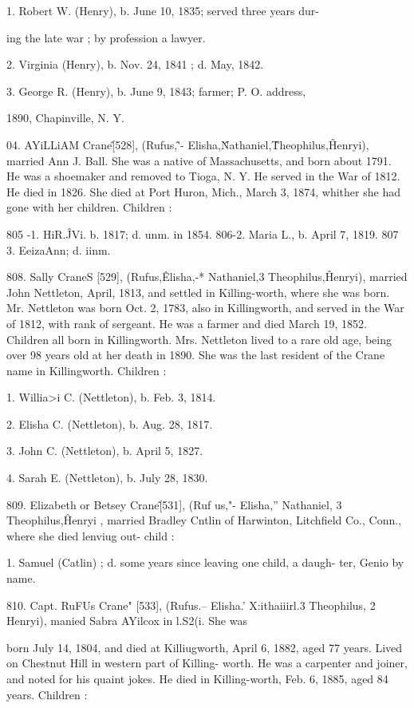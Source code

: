 \documentclass{book}
\begin{document}
1. Robert W. (Henry), b. June 10, 1835; served three years dur- 

ing the late war ; by profession a lawyer. 

2. Virginia (Henry), b. Nov. 24, 1841 ; d. May, 1842. 

3. George R. (Henry), b. June 9, 1843; farmer; P. O. address, 

1890, Chapinville, N. Y. 

04. AYiLLiAM Crane\^ [528], (Rufus,\^'- Elisha,\^ Nathaniel,\^ 
Theophilus,\^ Henryi), married Ann J. Ball. She was a native 
of Massachusetts, and born about 1791. He was a shoemaker 
and removed to Tioga, N. Y. He served in the War of 1812. 
He died in 1826. She died at Port Huron, Mich., March 3, 
1874, whither she had gone with her children. Children : 

805 -1. HiR.\^JVi. b. 1817; d. unm. in 1854. 
806-2. Maria L., b. April 7, 1819. 
807  3. EeizaAnn; d. iinm. 

808. Sally CraneS [529], (Rufus,\^ Elisha,-* Nathaniel,3 
Theophilus,\^ Henryi), married John Nettleton, April, 1813, and 
settled in Killing-worth, where she was born. Mr. Nettleton was 
born Oct. 2, 1783, also in Killingworth, and served in the War 
of 1812, with rank of sergeant. He was a farmer and died 
March 19, 1852. Children all born in Killingworth. Mrs. 
Nettleton lived to a rare old age, being over 98 years old at her 
death in 1890. She was the last resident of the Crane name in 
Killingworth. Children : 

1. Willia>i C. (Nettleton), b. Feb. 3, 1814. 

2. Elisha C. (Nettleton), b. Aug. 28, 1817. 

3. John C. (Nettleton), b. April 5, 1827. 

4. Sarah E. (Nettleton), b. July 28, 1830. 

809. Elizabeth or Betsey Crane\^ [531], (Ruf us,"- Elisha,'' 
Nathaniel, 3 Theophilus,\^ Henryi , married Bradley Cntlin of 
Harwinton, Litchfield Co., Conn., where she died lenviug out- 
child : 

1. Samuel (Catlin) ; d. some years since leaving one child, a daugh- 
ter, Genio by name. 

810. Capt. RuFUs Crane" [533], (Rufus.-- Elisha.' X:ithaiiirl.3 
Theophilus, 2 Henryi), manied Sabra AYilcox in l.S2(i. She was 




born July 14, 1804, and died at Killiugworth, April 6, 1882, 
aged 77 years. Lived on Chestnut Hill in western part of Killing- 
worth. He was a carpenter and joiner, and noted for his quaint 
jokes. He died in Killing-worth, Feb. 6, 1885, aged 84 years. 
Children : 
\end{document}
